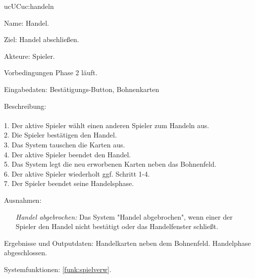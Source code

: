 \begin{description}[leftmargin=5em, style=sameline]
	\begin{lhp}{uc}{UC}{uc:handeln}
		\item [Name:] Handel.
		\item [Ziel:] Handel abschließen.
		\item [Akteure:] Spieler.
		\item [Vorbedingungen] Phase 2 läuft.
		\item [Eingabedaten:] Bestätigungs-Button, Bohnenkarten
		\item [Beschreibung:] \hfill\\ \hfill\\
			1. Der aktive Spieler wählt einen anderen Spieler zum Handeln aus.\\
			2. Die Spieler bestätigen den Handel.\\
			3. Das System tauschen die Karten aus.\\
			4. Der aktive Spieler beendet den Handel.\\
			5. Das System legt die neu erworbenen Karten neben das Bohnenfeld.\\
			6. Der aktive Spieler wiederholt ggf. Schritt 1-4.\\
		7. Der Spieler beendet seine Handelsphase.\\
		\item [Ausnahmen:] \hfill
			\begin{itemize} 
				\item[] \textit{Handel abgebrochen:} Das System "{}Handel abgebrochen{}"{}, wenn einer der Spieler den Handel nicht bestätigt oder das Handelfenster schließt.
				
			\end{itemize}
		\item [Ergebnisse und Outputdaten:] Handelkarten neben dem Bohnenfeld. Handelphase abgeschlossen. 
		\item [Systemfunktionen:] \ref{funk:spielverw}.
	\end{lhp}


\end{description}
